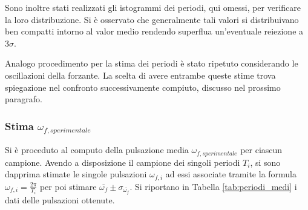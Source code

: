 \documentclass[a4paper,11pt,oneside]{article}
\begin{document}
Sono inoltre stati realizzati gli istogrammi dei periodi, qui omessi, per verificare la loro distribuzione. Si è osservato che generalmente tali valori si distribuivano ben compatti intorno al valor medio rendendo superflua un'eventuale reiezione a $3 \sigma$.

Analogo procedimento per la stima dei periodi è stato ripetuto considerando le oscillazioni della forzante. La scelta di avere entrambe queste stime trova spiegazione nel confronto successivamente compiuto, discusso nel prossimo paragrafo.

\subsubsection{Stima $\omega_{f, sperimentale}$}
Si è proceduto al computo della pulsazione media $\omega_{f, sperimentale}$ per ciascun campione. Avendo a disposizione il campione dei singoli periodi $T_{i}$, si sono dapprima stimate le singole pulsazioni $\omega_{f, i}$ ad essi associate tramite la formula $\omega_{f, i}=\frac{2\pi}{T_{i}}$ per poi stimare $\overline{\omega_{f}}\pm \sigma_{\overline{\omega_{f}}}$.
Si riportano in Tabella \ref{tab:periodi_medi} i dati delle pulsazioni ottenute.
\end{document}
